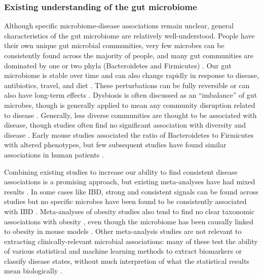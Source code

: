 \documentclass[12pt]{article}
\begin{document}
\subsubsection{Existing understanding of the gut microbiome}

Although specific microbiome-disease associations remain unclear, general characteristics
of the gut microbiome are relatively well-understood. People have their own unique gut microbial 
communities, very few microbes can be consistently found across the majority of people,
and many gut communities are dominated by one or two phyla (Bacteroidetes and Firmicutes) \cite{hmp-2012}.
Our gut microbiome is stable over time and can also change rapidly in response to 
disease, antibiotics, travel, and diet \cite{david-huge-2012}. These perturbations can be fully reversible
or can also have long-term effects \cite{david-huge-2012}.
Dysbiosis is often discussed as an ``imbalance'' of gut microbes, though
is generally applied to mean any community disruption related to disease \cite{costello-ecology-2012}.
Generally, less diverse communities are thought to be associated with disease,
though studies often find no significant association with diversity and disease \cite{walters-ob_meta-2014}.
Early mouse studies associated the ratio of Bacteroidetes to Firmicutes with
altered phenotypes, but few subsequent studies have found similar associations
in human patients \cite{turnbaugh-energy_harvest-2006, sze-signal-2016}. 

Combining existing studies to increase our ability to find consistent
disease associations is a promising approach, but existing meta-analyses
have had mixed results \cite{walters-ob_meta-2014, sze-signal-2016}. 
In some cases like IBD, strong and consistent 
signals can be found across studies but no specific microbes have 
been found to be consistently associated with IBD \cite{walters-ob_meta-2014}. Meta-analyses of obesity studies also tend 
to find no clear taxonomic associations with obesity \cite{sze-signal-2016, walters-ob_meta-2014},
even though the microbiome has been causally linked to obesity in mouse models \cite{turnbaugh-energy_harvest-2006, ridaura-mouse_fmt-2013}. 
Other meta-analysis studies are not relevant to extracting 
clinically-relevant microbial associations: many of these test the 
ability of various statistical and machine learning methods
to extract biomarkers or classify disease states, without much
interpretion of what the statistical results mean biologically
\cite{knights-supervised-2010, lozupone-meta-2013, knights-biomarkers-2011, pasolli-meta_analysis-2016}.
\end{document}
